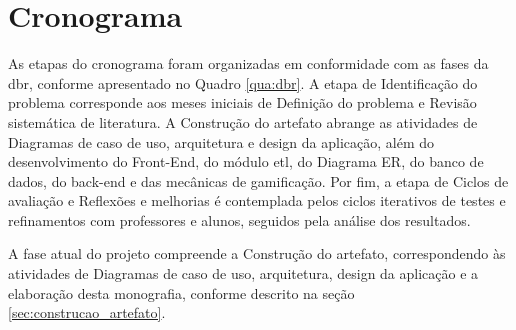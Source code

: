 \section{Cronograma}

As etapas do cronograma foram organizadas em conformidade com as fases da
\gls{dbr}, conforme apresentado no Quadro \ref{qua:dbr}. A etapa de
Identificação do problema corresponde aos meses iniciais de Definição do
problema e Revisão sistemática de literatura. A Construção do artefato abrange
as atividades de Diagramas de caso de uso, arquitetura e design da aplicação,
além do desenvolvimento do Front-End, do módulo \gls{etl}, do Diagrama ER, do
banco de dados, do back-end e das mecânicas de gamificação. Por fim, a etapa de
Ciclos de avaliação e Reflexões e melhorias é contemplada pelos ciclos
iterativos de testes e refinamentos com professores e alunos, seguidos pela
análise dos resultados.

A fase atual do projeto compreende a Construção do artefato, correspondendo às
atividades de Diagramas de caso de uso, arquitetura, design da aplicação e a
elaboração desta monografia, conforme descrito na seção
\ref{sec:construcao_artefato}.

